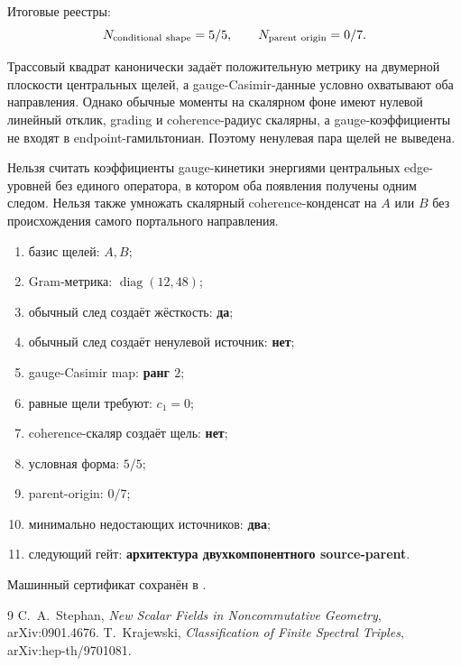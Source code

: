 Итоговые реестры:
\begin{equation}
 N_{\rm conditional\ shape}=5/5,
 \qquad N_{\rm parent\ origin}=0/7.
 \label{eq:v8-extra-mass-origin-ledgers}
\end{equation}

\begin{theorem}
Трассовый квадрат канонически задаёт положительную метрику на двумерной
плоскости центральных щелей, а gauge-Casimir-данные условно охватывают оба
направления. Однако обычные моменты на скалярном фоне имеют нулевой линейный
отклик, grading и coherence-радиус скалярны, а gauge-коэффициенты не входят
в endpoint-гамильтониан. Поэтому ненулевая пара щелей не выведена.
\end{theorem}

\begin{nogocriterion}
Нельзя считать коэффициенты gauge-кинетики энергиями центральных edge-
уровней без единого оператора, в котором оба появления получены одним
следом. Нельзя также умножать скалярный coherence-конденсат на $A$ или $B$
без происхождения самого портального направления.
\end{nogocriterion}

\begin{protocol}\begin{enumerate}
\item базис щелей: \textbf{$A,B$};
\item Gram-метрика: \textbf{$\operatorname{diag}(12,48)$};
\item обычный след создаёт жёсткость: \textbf{да};
\item обычный след создаёт ненулевой источник: \textbf{нет};
\item gauge-Casimir map: \textbf{ранг $2$};
\item равные щели требуют: \textbf{$c_1=0$};
\item coherence-скаляр создаёт щель: \textbf{нет};
\item условная форма: \textbf{$5/5$};
\item parent-origin: \textbf{$0/7$};
\item минимально недостающих источников: \textbf{два};
\item следующий гейт: \textbf{архитектура двухкомпонентного source-parent}.
\end{enumerate}\end{protocol}

Машинный сертификат сохранён в
.

\begin{thebibliography}{9}
 C.~A.~Stephan,
\emph{New Scalar Fields in Noncommutative Geometry}, arXiv:0901.4676.
 T.~Krajewski,
\emph{Classification of Finite Spectral Triples}, arXiv:hep-th/9701081.
\end{thebibliography}
